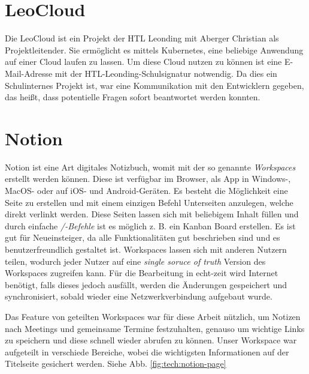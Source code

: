 \section{LeoCloud}
Die LeoCloud ist ein Projekt der HTL Leonding mit Aberger Christian als Projektleitender. 
Sie ermöglicht es mittels Kubernetes, eine beliebige Anwendung auf einer Cloud laufen zu lassen. 
Um diese Cloud nutzen zu können ist eine E-Mail-Adresse mit der HTL-Leonding-Schulsignatur notwendig. 
Da dies ein Schulinternes Projekt ist, war eine Kommunikation mit den Entwicklern gegeben, das heißt, dass potentielle Fragen sofort beantwortet werden konnten. 
\cite{LeoCloudAbout}

\section{Notion}
Notion ist eine Art digitales Notizbuch, womit mit der so genannte \emph{Workspaces} erstellt werden können. 
Diese ist verfügbar im Browser, als App in Windows-, MacOS- oder auf iOS- und Android-Geräten. 
Es besteht die Möglichkeit eine Seite zu erstellen und mit einem einzigen Befehl Unterseiten anzulegen, welche direkt verlinkt werden.
Diese Seiten lassen sich mit beliebigem Inhalt füllen und durch einfache \emph{/-Befehle} ist es möglich z. B. ein Kanban Board erstellen. 
Es ist gut für Neueinsteiger, da alle Funktionalitäten gut beschrieben sind und es benutzerfreundlich gestaltet ist.
Workspaces lassen sich mit anderen Nutzern teilen, wodurch jeder Nutzer auf eine \emph{single soruce of truth} Version des Workspaces zugreifen kann.
Für die Bearbeitung in echt-zeit wird Internet benötigt, falls dieses jedoch ausfällt, werden die Änderungen gespeichert und synchronisiert, sobald wieder eine Netzwerkverbindung aufgebaut wurde.
\cite{NotionAbout}

Das Feature von geteilten Workspaces war für diese Arbeit nützlich, um Notizen nach Meetings und gemeinsame Termine festzuhalten, genauso um wichtige Links zu speichern und diese schnell wieder abrufen zu können.
Unser Workspace war aufgeteilt in verschiede Bereiche, wobei die wichtigsten Informationen auf der Titelseite gesichert werden. Siehe Abb. \ref{fig:tech:notion-page}  

